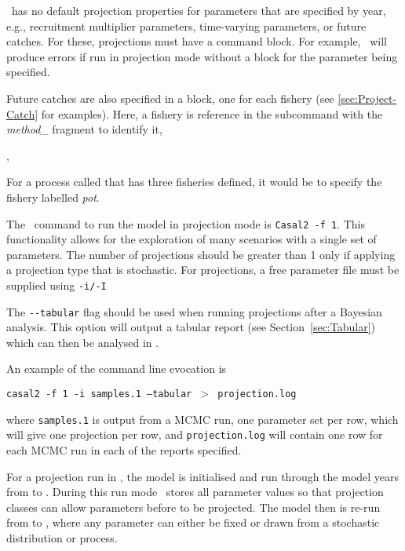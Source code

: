 \CNAME\ has no default projection properties for parameters that are specified by year, e.g., recruitment multiplier parameters, time-varying parameters, or future catches. For these, projections  must have a  command block. For example, \CNAME\ will produce errors if run in projection mode without a  block for the  parameter being specified.


Future catches are also specified in a  block, one for each fishery (see \ref{sec:Project-Catch} for examples). Here, a fishery is reference in the  subcommand with the \textit{method\_} fragment to identify it,

 ,

For a process called  that has three fisheries defined, it would be  to specify the fishery labelled \textit{pot}.

The \CNAME\ command to run the model in projection mode is \texttt{Casal2 -f 1}. This functionality allows for the exploration of many scenarios with a single set of parameters. The number of projections should be greater than 1 only if applying a projection type that is stochastic. For projections, a free parameter file must be supplied using \texttt{-i/-I}

The \texttt{-{}-tabular} flag should be used when running projections after a Bayesian analysis. This option will output a tabular report (see Section~\ref{sec:Tabular}) which can then be analysed in \R.

An example of the command line evocation is

\texttt{casal2 -f 1 -i samples.1 --tabular $>$ projection.log}

where \texttt{samples.1} is output from a MCMC run, one parameter set per row, which will give one projection per row, and \texttt{projection.log} will contain one row for each MCMC run in each of the reports specified.

For a projection run in \CNAME, the model is initialised and run through the model years from  to . During this run mode \CNAME\ stores all parameter values so that projection classes can allow parameters before  to be projected. The model then is re-run from  to , where any parameter can either be fixed or drawn from a stochastic distribution or process.


